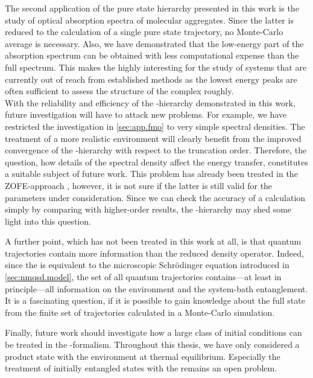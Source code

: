 The second application of the pure state hierarchy presented in this work is the study of optical absorption spectra of molecular aggregates.
Since the latter is reduced to the calculation of a single pure state trajectory, no Monte-Carlo average is necessary.
Also, we have demonstrated that the low-energy part of the absorption spectrum can be obtained with less computational expense than the full spectrum.
This makes the \NMSSE highly interesting for the study of systems that are currently out of reach from established methods as the lowest energy peaks are often sufficient to assess the structure of the complex roughly.\\


With the reliability and efficiency of the \NMSSE-hierarchy demonstrated in this work, future investigation will have to attack new problems.
For example, we have restricted the investigation in \autoref{sec:app.fmo} to very simple spectral densities.
The treatment of a more realistic environment will clearly benefit from the improved convergence of the \NMSSE-hierarchy with respect to the truncation order.
Therefore, the question, how details of the spectral density affect the energy transfer, constitutes a suitable subject of future work.
This problem has already been treated in the \textsc{ZOFE}-approach \cite{RiRoSt11_fmo}, however, it is not sure if the latter is still valid for the parameters under consideration.
Since we can check the accuracy of a calculation simply by comparing with higher-order results, the \NMSSE-hierarchy may shed some light into this question.

A further point, which has not been treated in this work at all, is that quantum trajectories contain more information than the reduced density operator.
Indeed, since the \NMSSE is equivalent to the microscopic Schrödinger equation introduced in \autoref{sec:nmqsd.model}, the set of all quantum trajectories contains---at least in principle---all information on the environment and the system-bath entanglement.
It is a fascinating question, if it is possible to gain knowledge about the full state from the finite set of trajectories calculated in a Monte-Carlo simulation.

Finally, future work should investigate how a large class of initial conditions can be treated in the \NMSSE-formalism.
Throughout this thesis, we have only considered a product state with the environment at thermal equilibrium.
Especially the treatment of initially entangled states with the \NMSSE remains an open problem.

